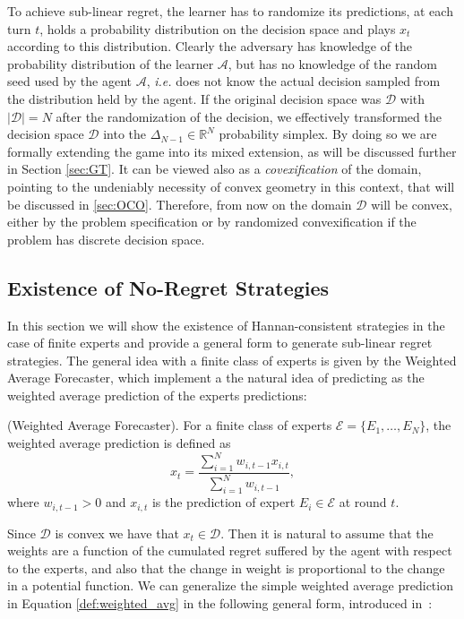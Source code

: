 To achieve sub-linear regret, the learner has to randomize its predictions, at each turn $t$, holds a probability distribution on the decision space and plays $x_t$ according to this distribution. Clearly the adversary has knowledge of the probability distribution of the learner $\mathcal A$, but has no knowledge of the random seed used by the agent $\mathcal A$, \emph{i.e.} does not know the actual decision sampled from the distribution held by the agent. If the original decision space was $\mathcal D$ with $|\mathcal D|=N$ after the randomization of the decision, we effectively transformed the decision space $\mathcal D$ into the $\Delta_{N-1}\in\mathbb R^{N}$ probability simplex. By doing so we are formally extending the game into its mixed extension, as will be discussed further in Section \ref{sec:GT}. It can be viewed also as a \emph{covexification} of the domain, pointing to the undeniably necessity of convex geometry in this context, that will be discussed in \ref{sec:OCO}. Therefore, from now on the domain $\mathcal D$ will be convex, either by the problem specification or by randomized convexification if the problem has discrete decision space.

\subsection{Existence of No-Regret Strategies}\label{sec:existence_of_no_regret}
In this section we will show the existence of Hannan-consistent strategies in the case of finite experts and provide a general form to generate sub-linear regret strategies. 
The general idea with a finite class of experts is given by the Weighted Average Forecaster, which implement a the natural idea of predicting as the weighted average prediction of the experts predictions:

\begin{definition}(Weighted Average Forecaster).\label{def:weighted_avg}
For a finite class of experts $\mathcal E=\{E_1,\ldots,E_N\}$, the weighted average prediction is defined as
\begin{equation}
	x_t = \frac{\sum\limits_{i=1}^{N}w_{i,t-1}x_{i,t}}{\sum\limits_{i=1}^{N}w_{i,t-1}},
\end{equation}
where $w_{i,t-1}>0$ and $x_{i,t}$ is the prediction of expert $E_i\in\mathcal E$ at round $t$. 
\end{definition}

Since $\mathcal D$ is convex we have that $x_t\in\mathcal D$.
Then it is natural to assume that the weights are a function of the cumulated regret suffered by the agent with respect to the experts, and also that the change in weight is proportional to the change in a potential function.
We can generalize the simple weighted average prediction in Equation \eqref{def:weighted_avg} in the following general form, introduced in~\cite{cesa2003potential}:


